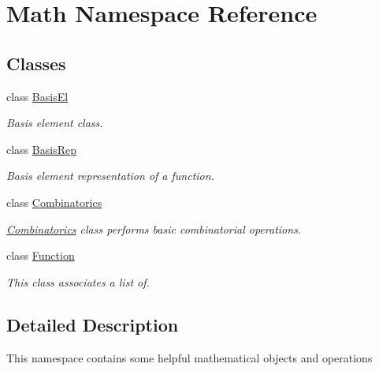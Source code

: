 \hypertarget{namespace_math}{}\section{Math Namespace Reference}
\label{namespace_math}
\subsection*{Classes}
\begin{DoxyCompactItemize}
\item 
class \mbox{\hyperlink{class_math_1_1_basis_el}{Basis\+El}}
\begin{DoxyCompactList}\small\item\em Basis element class. \end{DoxyCompactList}\item 
class \mbox{\hyperlink{class_math_1_1_basis_rep}{Basis\+Rep}}
\begin{DoxyCompactList}\small\item\em Basis element representation of a function. \end{DoxyCompactList}\item 
class \mbox{\hyperlink{class_math_1_1_combinatorics}{Combinatorics}}
\begin{DoxyCompactList}\small\item\em \mbox{\hyperlink{class_math_1_1_combinatorics}{Combinatorics}} class performs basic combinatorial operations. \end{DoxyCompactList}\item 
class \mbox{\hyperlink{class_math_1_1_function}{Function}}
\begin{DoxyCompactList}\small\item\em This class associates a list of. \end{DoxyCompactList}\end{DoxyCompactItemize}


\subsection{Detailed Description}
This namespace contains some helpful mathematical objects and operations 
